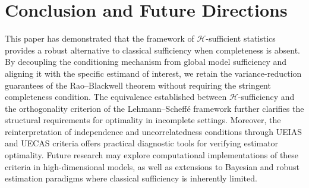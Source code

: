 \documentclass[twoside]{article}
\begin{document}
\section{Conclusion and Future Directions}\label{sec:conc}
This paper has demonstrated that the framework of $\mathscr{H}$-sufficient statistics provides a robust alternative to classical sufficiency when completeness is absent. By decoupling the conditioning mechanism from global model sufficiency and aligning it with the specific estimand of interest, we retain the variance-reduction guarantees of the Rao--Blackwell theorem without requiring the stringent completeness condition. The equivalence established between $\mathscr{H}$-sufficiency and the orthogonality criterion of the Lehmann--Scheff\'{e} framework further clarifies the structural requirements for optimality in incomplete settings. Moreover, the reinterpretation of independence and uncorrelatedness conditions through UEIAS and UECAS criteria offers practical diagnostic tools for verifying estimator optimality. Future research may explore computational implementations of these criteria in high-dimensional models, as well as extensions to Bayesian and robust estimation paradigms where classical sufficiency is inherently limited.
\end{document}
